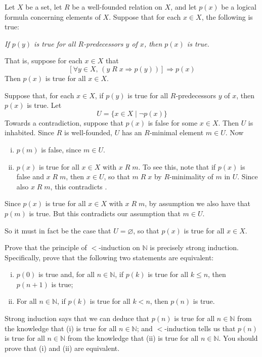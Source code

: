 \begin{theorem}
\label{thmWellFoundedInduction}
Let $X$ be a set, let $R$ be a well-founded relation on $X$, and let $p(x)$ be a logical formula concerning elements of $X$. Suppose that for each $x \in X$, the following is true:
\begin{center}
\textit{If $p(y)$ is true for all $R$-predecessors $y$ of $x$, then $p(x)$ is true.}
\end{center}
That is, suppose for each $x \in X$ that
\[ [\forall y \in X,\, (y\; R\; x \Rightarrow p(y))] \Rightarrow p(x) \]
Then $p(x)$ is true for all $x \in X$.
\end{theorem}
\begin{cproof}
Suppose that, for each $x \in X$, if $p(y)$ is true for all $R$-predecessors $y$ of $x$, then $p(x)$ is true. Let
\[ U = \{ x \in X \mid \neg p(x) \} \]
Towards a contradiction, suppose that $p(x)$ is false for some $x \in X$. Then $U$ is inhabited. Since $R$ is well-founded, $U$ has an $R$-minimal element $m \in U$. Now
\begin{enumerate}[(i)]
\item $p(m)$ is false, since $m \in U$.
\item $p(x)$ is true for all $x \in X$ with $x\; R\; m$. To see this, note that if $p(x)$ is false and $x\; R\; m$, then $x \in U$, so that $m\; R\; x$ by $R$-minimality of $m$ in $U$. Since also $x\; R\; m$, this contradicts .
\end{enumerate}
Since $p(x)$ is true for all $x \in X$ with $x\; R\; m$, by assumption we also have that $p(m)$ is true. But this contradicts our assumption that $m \in U$.

So it must in fact be the case that $U = \varnothing$, so that $p(x)$ is true for all $x \in X$.
\end{cproof}

\begin{exercise}
Prove that the principle of $<$-induction on $\mathbb{N}$ is precisely strong induction. Specifically, prove that the following two statements are equivalent:
\begin{enumerate}[(i)]
\item $p(0)$ is true and, for all $n \in \mathbb{N}$, if $p(k)$ is true for all $k \le n$, then $p(n+1)$ is true;
\item For all $n \in \mathbb{N}$, if $p(k)$ is true for all $k<n$, then $p(n)$ is true.
\end{enumerate}
Strong induction says that we can deduce that $p(n)$ is true for all $n \in \mathbb{N}$ from the knowledge that (i) is true for all $n \in \mathbb{N}$; and $<$-induction tells us that $p(n)$ is true for all $n \in \mathbb{N}$ from the knowledge that (ii) is true for all $n \in \mathbb{N}$. You should prove that (i) and (ii) are equivalent.
\end{exercise}

